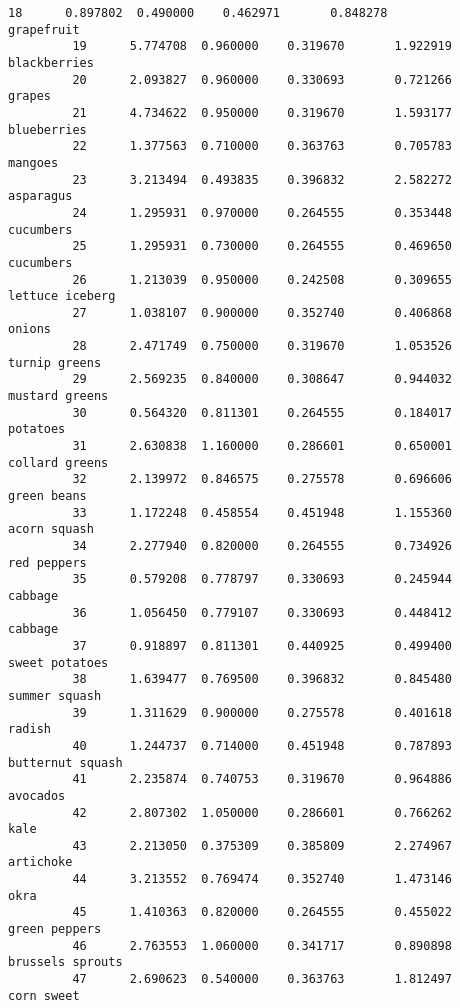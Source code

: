 \documentclass[11pt]{article}
\begin{document}
\begin{Verbatim}[commandchars=\\\{\}]
         18      0.897802  0.490000    0.462971       0.848278        grapefruit   
         19      5.774708  0.960000    0.319670       1.922919      blackberries   
         20      2.093827  0.960000    0.330693       0.721266            grapes   
         21      4.734622  0.950000    0.319670       1.593177       blueberries   
         22      1.377563  0.710000    0.363763       0.705783           mangoes   
         23      3.213494  0.493835    0.396832       2.582272         asparagus   
         24      1.295931  0.970000    0.264555       0.353448         cucumbers   
         25      1.295931  0.730000    0.264555       0.469650         cucumbers   
         26      1.213039  0.950000    0.242508       0.309655   lettuce iceberg   
         27      1.038107  0.900000    0.352740       0.406868            onions   
         28      2.471749  0.750000    0.319670       1.053526     turnip greens   
         29      2.569235  0.840000    0.308647       0.944032    mustard greens   
         30      0.564320  0.811301    0.264555       0.184017          potatoes   
         31      2.630838  1.160000    0.286601       0.650001    collard greens   
         32      2.139972  0.846575    0.275578       0.696606       green beans   
         33      1.172248  0.458554    0.451948       1.155360      acorn squash   
         34      2.277940  0.820000    0.264555       0.734926       red peppers   
         35      0.579208  0.778797    0.330693       0.245944           cabbage   
         36      1.056450  0.779107    0.330693       0.448412           cabbage   
         37      0.918897  0.811301    0.440925       0.499400    sweet potatoes   
         38      1.639477  0.769500    0.396832       0.845480     summer squash   
         39      1.311629  0.900000    0.275578       0.401618            radish   
         40      1.244737  0.714000    0.451948       0.787893  butternut squash   
         41      2.235874  0.740753    0.319670       0.964886          avocados   
         42      2.807302  1.050000    0.286601       0.766262              kale   
         43      2.213050  0.375309    0.385809       2.274967         artichoke   
         44      3.213552  0.769474    0.352740       1.473146              okra   
         45      1.410363  0.820000    0.264555       0.455022     green peppers   
         46      2.763553  1.060000    0.341717       0.890898  brussels sprouts   
         47      2.690623  0.540000    0.363763       1.812497        corn sweet   
         

\end{Verbatim}
\end{document}
